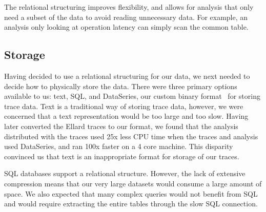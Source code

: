 The relational structuring improves flexibility, and allows for
analysis that only need a subset of the data to avoid reading
unnecessary data.  For example, an analysis only looking at operation
latency can simply scan the common table.

\subsection{Storage}

Having decided to use a relational structuring for our data, we next
needed to decide how to physically store the data.  There were three
primary options available to us: text, SQL, and DataSeries, our custom
binary format~\cite{DSTechnicalReportSnapshot} for storing trace data.
Text is a traditional way of storing trace data, however, we were
concerned that a text representation would be too large and too slow.
Having later converted the Ellard traces to our format, we found that
the analysis distributed with the traces used 25x less CPU time when
the traces and analysis used DataSeries, and ran 100x faster on a 4
core machine. This disparity convinced us that text is an
inappropriate format for storage of our traces.


SQL databases support a relational structure. However, the lack of 
extensive compression means that our very large datasets would 
consume a large amount of space. We also expected that many complex
queries would not benefit from SQL and would require extracting
the entire tables through the slow SQL connection.

